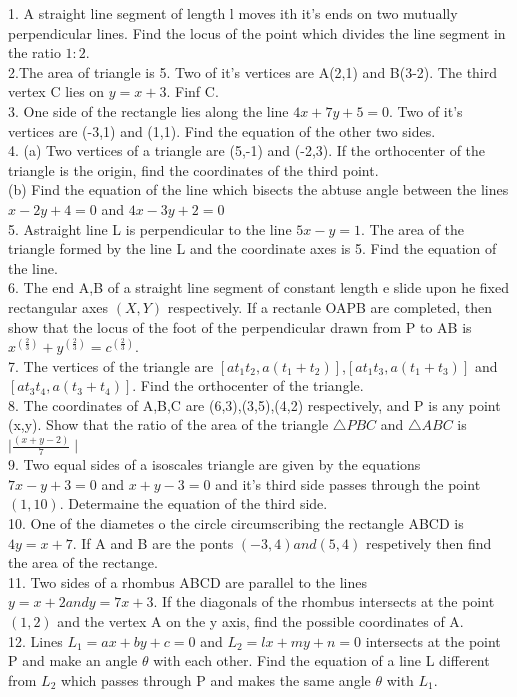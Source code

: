 \documentclass[12pt]{article}
\begin{document}
1. A straight line segment of length l moves ith it's ends on two mutually perpendicular lines. Find the locus of the point which divides the line segment in the ratio $1:2$.\\
2.The area of triangle is 5. Two of it's vertices are A(2,1) and B(3-2). The third vertex C lies on $y=x+3$. Finf C.\\
3. One side of the rectangle lies along the line $4x+7y+5=0$. Two of it's vertices are (-3,1) and (1,1). Find the equation of the other two sides.\\
4. (a) Two vertices of a triangle are (5,-1) and (-2,3). If the orthocenter of the triangle is the origin, find the coordinates of the third point.\\
 (b) Find the equation of the line which bisects the abtuse angle between the lines $x-2y+4=0$ and $4x-3y+2=0$\\
 5. Astraight line L is perpendicular to the line $5x-y=1$. The area of the triangle formed by the line L and the coordinate axes is 5. Find the equation of the line.\\
 6. The end A,B of a straight line segment of constant length e slide upon he fixed rectangular axes $(X,Y)$ respectively. If a rectanle OAPB are completed, then show that the locus of the foot of the perpendicular drawn from P to AB is $x^(\frac{2}{3})+y^(\frac{2}{3})=c^(\frac{2}{3})$.\\
 7. The vertices of the triangle are $[at_1t_2,a(t_1+t_2)]$,$[at_1t_3,a(t_1+t_3)]$ and $[at_3t_4,a(t_3+t_4)]$. Find the orthocenter of the triangle.\\
8. The coordinates of A,B,C are  (6,3),(3,5),(4,2) respectively, and P is any point (x,y). Show that the ratio of the area of the triangle $\triangle PBC$ and $\triangle ABC $ is $\mid\frac{(x+y-2)}{7}\mid$\\
9. Two equal sides of a isoscales triangle are given by the equations $7x-y+3=0$ and $x+y-3=0$ and it's third side passes through the point $(1,10)$. Determaine the equation of the third side.\\
10. One of the diametes o the circle circumscribing the rectangle ABCD is $4y=x+7$. If A and B are the ponts $(-3,4) and (5,4)$ respetively then find the area of the rectange.\\
11. Two sides of a rhombus ABCD are parallel to the lines $y=x+2 and y=7x+3$. If the diagonals of the rhombus intersects at the point $(1,2)$ and the vertex A on the y axis, find the possible coordinates of A.\\
12. Lines $L_1=ax+by+c=0$ and $L_2=lx+my+n=0$ intersects at the point P and make an angle $\theta$ with each other. Find the equation of a line L different from $L_2$ which passes through P and makes the same angle $\theta$ with $L_1$.\\
\end{document}
